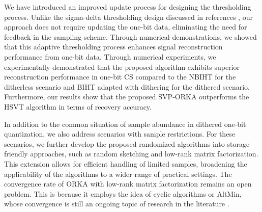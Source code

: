 \documentclass[12pt,draftcls,onecolumn]{IEEEtran}
\begin{document}
We have introduced an improved update process for designing the thresholding process. Unlike the sigma-delta thresholding design discussed in references \cite{baraniuk2017exponential,foucart2019recovering}, our approach does not require updating the one-bit data, eliminating the need for feedback in the sampling scheme. Through numerical demonstrations, we showed that this adaptive thresholding process enhances signal reconstruction performance from one-bit data.
Through numerical experiments, we experimentally demonstrated that the proposed algorithm exhibits superior reconstruction performance in one-bit CS compared to the NBIHT for the ditherless scenario and BIHT adapted with dithering for the dithered scenario. Furthermore, our results show that the proposed SVP-ORKA outperforms the HSVT algorithm in terms of recovery accuracy. 

In addition to the common situation of sample abundance in dithered one-bit quantization, we also address scenarios with sample restrictions. For these scenarios, we further develop the proposed randomized algorithms into storage-friendly approaches, such as random sketching and low-rank matrix factorization. This extension allows for efficient handling of limited samples, broadening the applicability of the algorithms to a wider range of practical settings. The convergence rate of ORKA with low-rank matrix factorization remains an open problem. This is because it employs the idea of cyclic algorithms or AltMin, whose convergence is still an ongoing topic of research in the literature \cite{chi2019nonconvex}. 



\appendices
\end{document}
